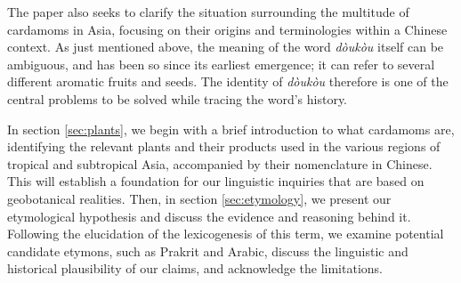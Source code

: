 \documentclass[12pt]{article}
\newcommand{\tc}[1]{\traditionalchinesefont{#1}\rmfamily}
\begin{document}





The paper also seeks to clarify the situation surrounding the multitude of cardamoms in Asia, focusing on their origins and terminologies within a Chinese context. As just mentioned above, the meaning of the word \textit{dòukòu} itself can be ambiguous, and has been so since its earliest emergence; it can refer to several different aromatic fruits and seeds. The identity of \textit{dòukòu} therefore is one of the central problems to be solved while tracing the word's history.


In section \ref{sec:plants}, we begin with a brief introduction to what cardamoms are, identifying the relevant plants and their products used in the various regions of tropical and subtropical Asia, accompanied by their nomenclature in Chinese. This will establish a foundation for our linguistic inquiries that are based on geobotanical realities. Then, in section \ref{sec:etymology}, we present our etymological hypothesis and discuss the evidence and reasoning behind it. Following the elucidation of the lexicogenesis of this term, we examine potential candidate etymons, such as Prakrit and Arabic, discuss the linguistic and historical plausibility of our claims, and acknowledge the limitations.
\end{document}
